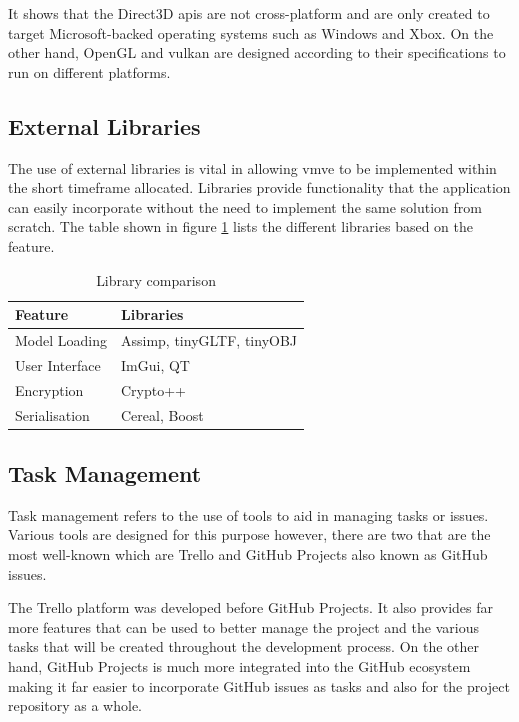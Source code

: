 \documentclass[11pt]{article}
\begin{document}
It shows that the Direct3D \glspl*{api} are not cross-platform and are only
created to target Microsoft-backed operating systems such as Windows and Xbox.
On the other hand, OpenGL and \gls*{vulkan} are designed according to their
specifications to run on different platforms.

\subsection{External Libraries}
The use of external libraries is vital in allowing \gls*{vmve} to be implemented
within the short timeframe allocated. Libraries provide functionality that the
application can easily incorporate without the need to implement the same
solution from scratch. The table shown in figure \ref{tab:library_compare} lists
the different libraries based on the feature.

\begin{table}[H]
  \centering
  \footnotesize
  \setlength{\tabcolsep}{4pt}
  \begin{tabular}{>{\centering\arraybackslash}m{2.5cm} >{\centering\arraybackslash}m{3.5cm}}
  \toprule
  \rowcolor{gray!50}
  \textbf{Feature} & \textbf{Libraries} \\ \midrule
  Model Loading      &  Assimp, tinyGLTF, tinyOBJ \\ \addlinespace
  User Interface    & ImGui, QT \\ \addlinespace
  Encryption    & Crypto++ \\ \addlinespace
  Serialisation   & Cereal, Boost \\ \bottomrule
  \end{tabular}
  \caption{Library comparison}
  \label{tab:library_compare}
\end{table}


\subsection{Task Management}
Task management refers to the use of tools to aid in managing tasks or issues.
Various tools are designed for this purpose however, there are two that are the most
well-known which are Trello and GitHub Projects also known as GitHub issues.

The Trello platform was developed before GitHub Projects. It also provides far
more features that can be used to better manage the project and the various
tasks that will be created throughout the development process. On the other
hand, GitHub Projects is much more integrated into the GitHub ecosystem making
it far easier to incorporate GitHub issues as tasks and also for the project
repository as a whole.
\end{document}
